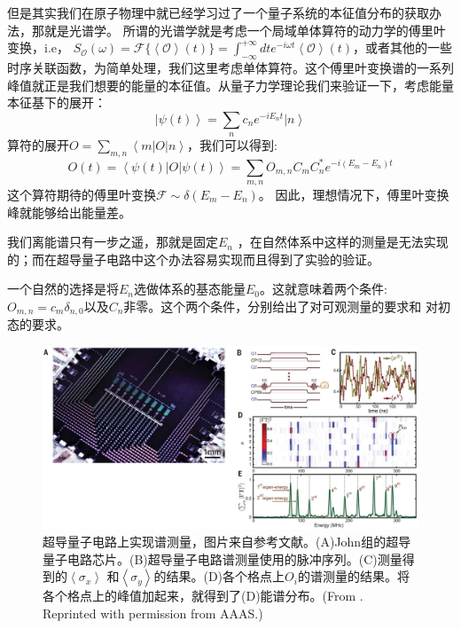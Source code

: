 \documentclass[supercite]{HustGraduPaper}
\newcommand{\bra}[1]{\left\langle #1 \right|}
\newcommand{\ket}[1]{\left| #1 \right\rangle}
\newcommand{\avg}[1]{\left\langle #1 \right\rangle}
\begin{document}
   但是其实我们在原子物理中就已经学习过了一个量子系统的本征值分布的获取办法，那就是光谱学。 所谓的光谱学就是考虑一个局域单体算符的动力学的傅里叶变换，i.e， $S_{\mathcal{O}}(\omega) = \mathcal{F}\{\avg{\mathcal{O}} (t)\} = \int_{-\infty}^{+\infty}dt e^{-i\omega t} \avg{\mathcal{O}} (t)$，或者其他的一些时序关联函数，为简单处理，我们这里考虑单体算符。这个傅里叶变换谱的一系列峰值就正是我们想要的能量的本征值。从量子力学理论我们来验证一下，考虑能量本征基下的展开：
  \begin{equation}
  \ket{\psi(t)} = \sum_n c_n e^{-iE_n t} \ket{n}  
  \end{equation}
   算符的展开$O = \sum_{m,n} \bra{m} O \ket{n}$，我们可以得到:
   \begin{equation}
   O(t) = \bra{\psi(t)} O \ket{\psi(t)} = \sum_{m,n} O_{m,n} C_m C^*_n e^{-i(E_m - E_n)t}
   \end{equation}
这个算符期待的傅里叶变换$\mathcal{F}\sim \delta(E_m - E_n) $。 因此，理想情况下，傅里叶变换峰就能够给出能量差。

我们离能谱只有一步之遥，那就是固定$E_n$ ，在自然体系中这样的测量是无法实现的；而在超导量子电路中这个办法容易实现而且得到了实验的验证。

一个自然的选择是将$E_n$选做体系的基态能量$E_0$。这就意味着两个条件:$O_{m,n} = c_m \delta_{n,0}$以及$C_n$非零。这个两个条件，分别给出了对可观测量的要求和
对初态的要求。
\begin{figure}
	\centering
	\includegraphics[width=1\linewidth]{Figures/spectroscopy/F1.large.jpg}
	\caption{超导量子电路上实现谱测量，图片来自参考文献\cite{Roushan2017}。(A)John组的超导量子电路芯片。(B)超导量子电路谱测量使用的脉冲序列。(C)测量得到的$\avg{\sigma_x}$ 和$\avg{\sigma_y}$的结果。(D)各个格点上$O_i$的谱测量的结果。将各个格点上的峰值加起来，就得到了(D)能谱分布。(From \cite{Roushan2017}. Reprinted with permission from AAAS.)}
	\label{fig:f1}
\end{figure}
\end{document}
